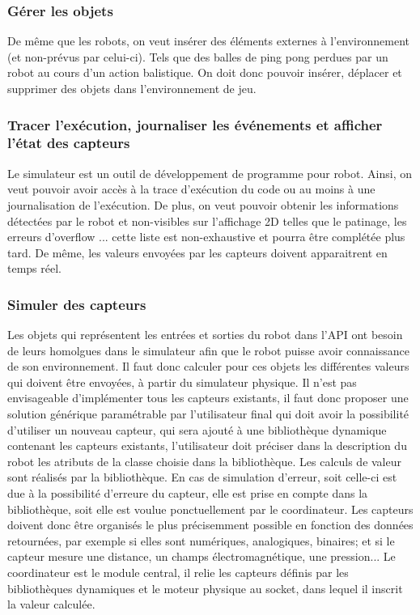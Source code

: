 \subsubsection{Gérer les objets}
De même que les robots, on veut insérer des éléments externes à l'environnement (et non-prévus par celui-ci). Tels que des balles de ping pong perdues par un robot au cours d'un action balistique. On doit donc pouvoir insérer, déplacer et supprimer des objets dans l'environnement de jeu.

\subsubsection{Tracer l'exécution, journaliser les événements et afficher l'état des capteurs}
Le simulateur est un outil de développement de programme pour robot. Ainsi, on veut pouvoir avoir accès à la trace d'exécution du code ou au moins à une journalisation de l'exécution. De plus, on veut pouvoir obtenir les informations détectées par le robot et non-visibles sur l'affichage 2D telles que le patinage, les erreurs d'overflow ... cette liste est non-exhaustive et pourra être complétée plus tard. De même, les valeurs envoyées par les capteurs doivent apparaitrent en temps réel.

\subsubsection{Simuler des capteurs}
Les objets qui représentent les entrées et sorties du robot dans l'API ont besoin de leurs homolgues dans le simulateur afin que le robot puisse avoir connaissance de son environnement. Il faut donc calculer pour ces objets les différentes valeurs qui doivent être envoyées, à partir du simulateur physique. Il n'est pas envisageable d'implémenter tous les capteurs existants, il faut donc proposer une solution générique paramétrable par l'utilisateur final qui doit avoir la possibilité d'utiliser un nouveau capteur, qui sera ajouté à une bibliothèque dynamique contenant les capteurs existants, l'utilisateur doit préciser dans la description du robot les atributs de la classe choisie dans la bibliothèque. Les calculs de valeur sont réalisés par la bibliothèque. En cas de simulation d'erreur, soit celle-ci est due à la possibilité d'erreure du capteur, elle est prise en compte dans la bibliothèque, soit elle est voulue ponctuellement par le coordinateur. Les capteurs doivent donc être organisés le plus précisemment possible en fonction des données retournées, par exemple si elles sont numériques, analogiques, binaires; et si le capteur mesure une distance, un champs électromagnétique, une pression...
Le coordinateur est le module central, il relie les capteurs définis par les bibliothèques dynamiques et le moteur physique au socket, dans lequel il inscrit la valeur calculée.


